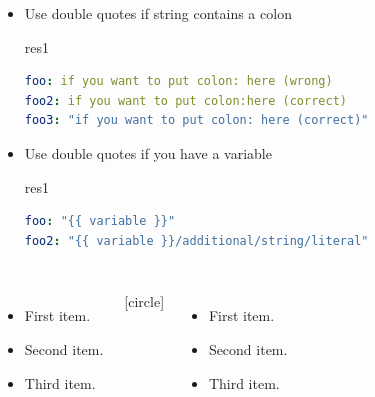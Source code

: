 \documentclass[pdf, 8pt, unicode, t]{beamer} %
\begin{document}
\begin{frame}[fragile,label=yaml4]
\begin{columns}[t,onlytextwidth]
\begin{itemize}
\item Use double quotes if string contains a colon
  \begin{beamercolorbox}[wd=0.9\textwidth,sep=-1.0em,rounded=true,shadow=true,center]{res1}
  \begin{lstlisting}[language=yaml]
foo: if you want to put colon: here (wrong)
foo2: if you want to put colon:here (correct)
foo3: "if you want to put colon: here (correct)"
  \end{lstlisting}
  \end{beamercolorbox}

\item Use double quotes if you have a variable
  \begin{beamercolorbox}[wd=0.9\textwidth,sep=-1.0em,rounded=true,shadow=true,center]{res1}
  \begin{lstlisting}[language=yaml]
foo: "{{ variable }}"
foo2: "{{ variable }}/additional/string/literal"
  \end{lstlisting}
  \end{beamercolorbox}

\end{itemize}

\end{columns}

\end{frame}

\begin{frame}
\begin{columns}
  \begin{itemize}
  \item First item.
  \item Second item.
  \item Third item.
  \end{itemize}
[circle]
  \begin{itemize}
  \item First item.
  \item Second item.
  \item Third item.
  \end{itemize}
\end{columns}
\end{frame}
\end{document}
